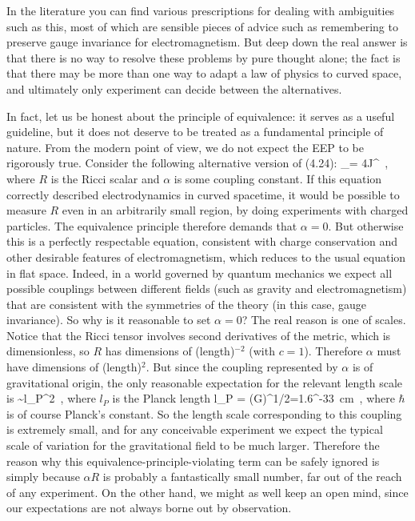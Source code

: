 In the literature you can find various prescriptions for dealing with
ambiguities such as this, most of which are sensible pieces of advice such 
as remembering to preserve gauge invariance for electromagnetism.  But
deep down the real answer is that there is no way to resolve these
problems by pure thought alone; the fact is that there may be more
than one way to adapt a law of physics to curved space, and ultimately
only experiment can decide between the alternatives.

In fact, let us be honest about the principle of equivalence: it serves
as a useful guideline, but it does not deserve to be treated as a
fundamental principle of nature.  From the modern point of view, we
do not expect the EEP to be rigorously true.  Consider the following
alternative version of (4.24):
\be
  \nabla_\mu[(1+\alpha R)F^{\nu\mu}] = 4\pi J^\nu\ ,\label{4.32}
\ee
where $R$ is the Ricci scalar and $\alpha$ is some coupling constant.
If this equation correctly described electrodynamics in curved
spacetime, it would be possible to measure $R$ even in an arbitrarily
small region, by doing experiments with charged particles.  The 
equivalence principle therefore demands that $\alpha=0$.  But
otherwise this is a perfectly respectable equation, consistent with
charge conservation and other desirable features of electromagnetism,
which reduces to the usual equation in flat space.  Indeed, in a 
world governed by quantum mechanics we expect all possible couplings
between different fields (such as gravity and electromagnetism) that
are consistent with the symmetries of the theory (in this case,
gauge invariance).  So why is it reasonable to set $\alpha=0$? The
real reason is one of scales.  Notice that the Ricci tensor involves
second derivatives of the metric, which is dimensionless, so $R$
has dimensions of (length)$^{-2}$ (with $c=1$).  Therefore $\alpha$ must 
have dimensions of (length)$^{2}$.  But since the coupling represented by
$\alpha$ is of gravitational origin, the only reasonable expectation
for the relevant length scale is
\be
  \alpha \sim l_P^2\ ,\label{4.33}
\ee
where $l_P$ is the Planck length
\be
  l_P = \left({{G\hbar}}\right)^{1/2}=1.6^{-33}{\rm ~cm}\ ,\label{4.34}
\ee
where $\hbar$ is of course Planck's constant.  So the length scale
corresponding to this coupling is extremely small, and for any
conceivable experiment we expect the typical scale of variation for
the gravitational field to be much larger.  Therefore the reason why
this equivalence-principle-violating term can be safely ignored is 
simply because $\alpha R$ is probably a fantastically small number, far
out of the reach of any experiment.  On the other hand, we might as
well keep an open mind, since our expectations are not always borne
out by observation.

